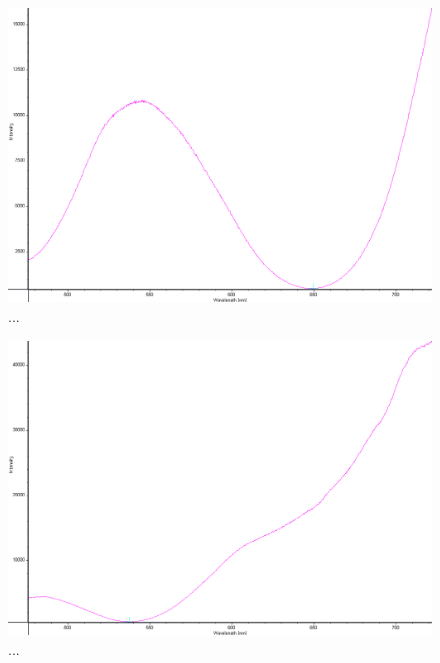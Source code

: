 \documentclass[a4paper]{article}
\begin{document}
\FloatBarrier
\begin{figure}[h!]
	\centering
	\includegraphics[width=\linewidth]{data/spektra_aktiv2_inv}
	\caption{...}
	\label{fig:}
\end{figure}
\FloatBarrier

\FloatBarrier
\begin{figure}[h!]
	\centering
	\includegraphics[width=\linewidth]{data/spektra_aktiv3_inv}
	\caption{...}
	\label{fig:}
\end{figure}
\FloatBarrier
\end{document}
